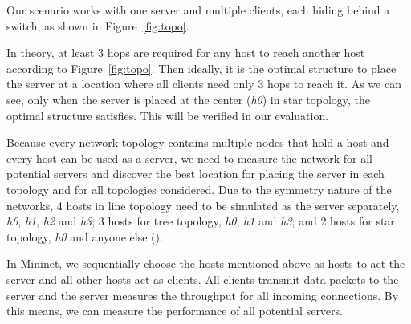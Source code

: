 Our scenario works with one server and multiple clients, each hiding behind a 
switch, as shown in Figure~\ref{fig:topo}.

In theory, at least 3 hops are required for any host to reach another host according
to Figure~\ref{fig:topo}. Then ideally, it is the optimal structure to place the server 
at a location where all clients need only 3 hops to reach it. As we can see, only 
when the server is placed at the center ({\it h0}) in star topology, the optimal 
structure satisfies. This will be verified in our evaluation.

Because every network topology contains multiple nodes that hold a host and every 
host can be used as a server, we need to measure the network for all potential servers
and discover the best location for placing the server in each topology and for all
topologies considered. Due to the symmetry nature of the networks, 4 hosts in line topology
need to be simulated as the server separately, {\it h0}, {\it h1}, {\it h2} and 
{\it h3}; 3 hosts for tree topology, {\it h0}, {\it h1} and {\it h3}; and 
2 hosts for star topology, {\it h0} and anyone else (). 

In Mininet, we sequentially choose the hosts mentioned above as hosts 
to act the server and all other hosts act as clients. All clients transmit
data packets to the server and the server measures the throughput for all 
incoming connections. By this means, we can measure the performance of 
all potential servers. 